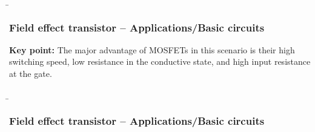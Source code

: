 \begin{frame}
    \b{\frametitle{Field effect transistor -- Applications/Basic circuits}
        \textbf{Key point:}
        The major advantage of MOSFETs in this scenario is their high switching speed, low resistance in the conductive state,
        and high input resistance at the gate.
        }
\end{frame}

\begin{frame}
    \b{ \frametitle{Field effect transistor -- Applications/Basic circuits}
        \begin{figure}[H]
            \begin{minipage}[h]{0.48\textwidth}
                \centering
                
            \end{minipage}
            \begin{minipage}[c]{0.48\textwidth}
                \centering
                  
            \end{minipage}
        \end{figure}
    }
\end{frame}









